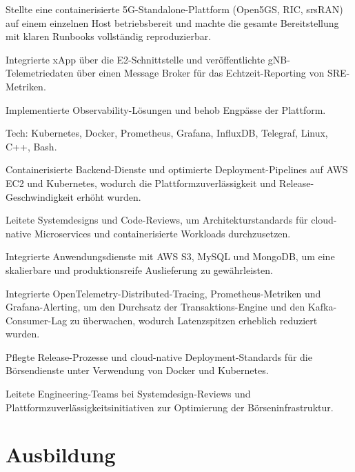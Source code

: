 \documentclass[10pt,a4paper]{resume}
\begin{document}
\bullets
  \item Stellte eine containerisierte 5G-Standalone-Plattform (Open5GS, RIC, srsRAN) auf einem einzelnen Host betriebsbereit und machte die gesamte Bereitstellung mit klaren Runbooks vollständig reproduzierbar.
  \item Integrierte xApp über die E2-Schnittstelle und veröffentlichte gNB-Telemetriedaten über einen Message Broker für das Echtzeit-Reporting von SRE-Metriken.
  \item Implementierte Observability-Lösungen und behob Engpässe der Plattform.
  \item Tech: Kubernetes, Docker, Prometheus, Grafana, InfluxDB, Telegraf, Linux, C++, Bash.
\bulletsend
\vspace{1.5pt}
\bullets
  \item Containerisierte Backend-Dienste und optimierte Deployment-Pipelines auf AWS EC2 und Kubernetes, wodurch die Plattformzuverlässigkeit und Release-Geschwindigkeit erhöht wurden.
  \item Leitete Systemdesigns und Code-Reviews, um Architekturstandards für cloud-native Microservices und containerisierte Workloads durchzusetzen.
  \item Integrierte Anwendungsdienste mit AWS S3, MySQL und MongoDB, um eine skalierbare und produktionsreife Auslieferung zu gewährleisten.
\bulletsend
\vspace{1.5pt}
\bullets
  \item Integrierte OpenTelemetry-Distributed-Tracing, Prometheus-Metriken und Grafana-Alerting, um den Durchsatz der Transaktions-Engine und den Kafka-Consumer-Lag zu überwachen, wodurch Latenzspitzen erheblich reduziert wurden.
  \item Pflegte Release-Prozesse und cloud-native Deployment-Standards für die Börsendienste unter Verwendung von Docker und Kubernetes.
  \item Leitete Engineering-Teams bei Systemdesign-Reviews und Plattformzuverlässigkeitsinitiativen zur Optimierung der Börseninfrastruktur.
\bulletsend
\vspace{1.5pt}

\section{Ausbildung}
\end{document}
